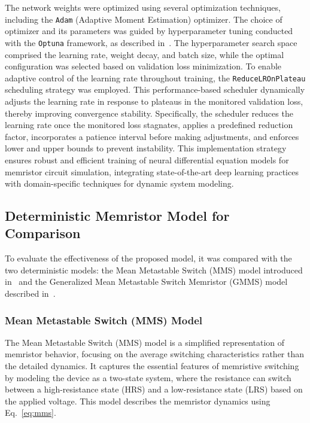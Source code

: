 \documentclass[lettersize,journal]{IEEEtran}
\begin{document}
The network weights were optimized using several optimization techniques, including the \texttt{Adam} (Adaptive Moment Estimation) optimizer. The choice of optimizer and its parameters was guided by hyperparameter tuning conducted with the \texttt{Optuna} framework, as described in~\cite{Akiba2019}. The hyperparameter search space comprised the learning rate, weight decay, and batch size, while the optimal configuration was selected based on validation loss minimization. To enable adaptive control of the learning rate throughout training, the \texttt{ReduceLROnPlateau} scheduling strategy was employed. This performance-based scheduler dynamically adjusts the learning rate in response to plateaus in the monitored validation loss, thereby improving convergence stability. Specifically, the scheduler reduces the learning rate once the monitored loss stagnates, applies a predefined reduction factor, incorporates a patience interval before making adjustments, and enforces lower and upper bounds to prevent instability. This implementation strategy ensures robust and efficient training of neural differential equation models for memristor circuit simulation, integrating state-of-the-art deep learning practices with domain-specific techniques for dynamic system modeling.

\subsection{Deterministic Memristor Model for Comparison}
\noindent To evaluate the effectiveness of the proposed model, it was compared with the two deterministic models: the Mean Metastable Switch (MMS) model introduced in~\cite{Minati2020} and the  Generalized Mean Metastable Switch Memristor (GMMS) model described in~\cite{Molter2016, Ostrovskii2021}.

\subsubsection{Mean Metastable Switch (MMS) Model}
The Mean Metastable Switch (MMS) model is a simplified representation of memristor behavior, focusing on the average switching characteristics rather than the detailed dynamics. It captures the essential features of memristive switching by modeling the device as a two-state system, where the resistance can switch between a high-resistance state (HRS) and a low-resistance state (LRS) based on the applied voltage. This model describes the memristor dynamics using Eq.~\eqref{eq:mms}.
\end{document}
